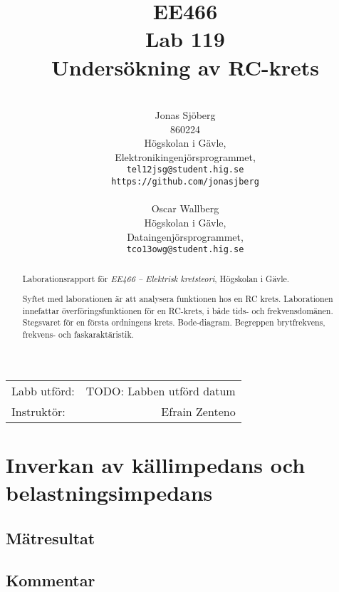\documentclass[11pt,a4paper]{article}
\title{EE466 \\ Lab 119 \\ Undersökning av RC-krets}
\author{                                 \\
  Jonas Sjöberg                          \\
  860224                                 \\
  Högskolan i Gävle,                     \\
  Elektronikingenjörsprogrammet,         \\
  \texttt{tel12jsg@student.hig.se}       \\
  \texttt{https://github.com/jonasjberg} \\
                                         \\
  Oscar Wallberg                         \\
  Högskolan i Gävle,                     \\
  Dataingenjörsprogrammet,               \\
  \texttt{tco13owg@student.hig.se}       \\
}
\date{}
\begin{document}
\maketitle

\begin{center}
    \begin{tabular}{l r}
        Labb utförd: & TODO: Labben utförd datum \\
        Instruktör: & Efrain Zenteno
    \end{tabular}
\end{center}

\medskip

\begin{abstract}
    \begin{center}
        Laborationsrapport för \emph{EE466 -- Elektrisk kretsteori}, Högskolan
        i Gävle.  \par Syftet med laborationen är att analysera funktionen hos
        en RC krets.  Laborationen innefattar överföringsfunktionen för en
        RC-krets, i både tids- och frekvensdomänen. Stegsvaret för en första
        ordningens krets.  Bode-diagram.  Begreppen brytfrekvens, frekvens- och
        faskaraktäristik.
    \end{center}
\end{abstract}

\newpage

{
    \setcounter{tocdepth}{3}
    \tableofcontents
}

\newpage







\section{Inverkan av källimpedans och belastningsimpedans}\label{}

\subsection{Mätresultat}\label{}

\subsection{Kommentar}\label{}
\end{document}
